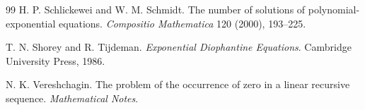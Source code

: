 \documentclass[11pt]{article}
\begin{document}
\begin{thebibliography}{99}
H. P. Schlickewei and W. M. Schmidt.
The number of solutions of polynomial-exponential equations.
\emph{Compositio Mathematica} 120 (2000), 193--225.

T. N. Shorey and R. Tijdeman.
\emph{Exponential Diophantine Equations}.
Cambridge University Press, 1986.

N. K. Vereshchagin.
The problem of the occurrence of zero in a linear recursive sequence.
\emph{Mathematical Notes}.

\end{thebibliography}
\end{document}
